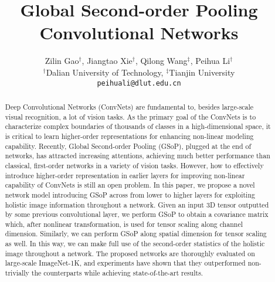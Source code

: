 \documentclass[10pt,twocolumn,letterpaper]{article}
\begin{document}
\title{Global Second-order Pooling Convolutional Networks}

\author{Zilin Gao$^{\dagger}$, Jiangtao Xie$^{\dagger}$, Qilong Wang$^{\ddagger}$, Peihua Li$^{\dagger}$\\
$^{\dagger}$Dalian University of Technology, $^{\ddagger}$Tianjin University\\
{\tt\small peihuali@dlut.edu.cn}
}

\maketitle

\begin{abstract}
Deep Convolutional Networks (ConvNets) are fundamental to, besides  large-scale visual recognition, a lot of  vision tasks. As the primary goal of the ConvNets is  to characterize complex  boundaries of thousands of classes in a high-dimensional space, it is critical to learn higher-order representations for enhancing non-linear modeling capability.  Recently, Global Second-order Pooling (GSoP), plugged at the end of networks, has attracted increasing attentions, achieving much better performance than classical, first-order networks  in a variety of vision tasks. However, how to effectively introduce higher-order representation in earlier layers for improving non-linear capability of ConvNets  is still an open problem. In this paper, we propose a novel network model introducing GSoP across from lower to higher layers for exploiting holistic image information throughout a network. Given an input 3D tensor outputted by some previous convolutional  layer, we perform  GSoP to obtain a covariance matrix which, after nonlinear transformation, is  used for tensor scaling along channel dimension. Similarly, we can perform  GSoP along spatial dimension for tensor scaling as well. In this way, we can make full use of the second-order statistics  of the holistic image throughout a network.  The proposed networks are thoroughly  evaluated on large-scale ImageNet-1K, and experiments have shown that they outperformed non-trivially  the counterparts while achieving state-of-the-art results.
\end{abstract}
\end{document}
